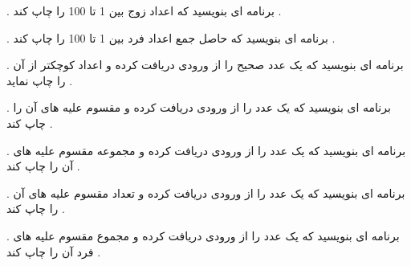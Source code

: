 \documentclass[12pt]{article}
\begin{document}
 . برنامه ای بنویسید که اعداد زوج بین 1 تا 100 را چاپ کند .














 . برنامه ای بنویسید که حاصل جمع اعداد فرد بین 1 تا 100 را چاپ کند .













 . برنامه ای بنویسید که یک عدد صحیح را از ورودی دریافت کرده و اعداد کوچکتر از آن را چاپ نماید .















 . برنامه ای بنویسید که یک عدد را از ورودی دریافت کرده و مقسوم علیه های آن را چاپ کند .













 . برنامه ای بنویسید که یک عدد را از ورودی دریافت کرده و مجموعه مقسوم علیه های آن را چاپ کند .










 . برنامه ای بنویسید که یک عدد را از ورودی دریافت کرده و تعداد مقسوم علیه های آن را چاپ کند .


















 . برنامه ای بنویسید که یک عدد را از ورودی دریافت کرده و مجموع مقسوم علیه های فرد آن را چاپ کند .
\end{document}
